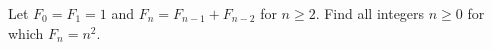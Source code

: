 Let $F_0=F_1=1$ and $F_n=F_{n-1}+F_{n-2}$ for $n\ge2$. Find all integers $n\ge0$ for which $F_n=n^2$.
